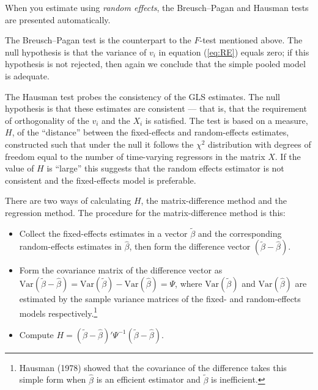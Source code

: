 When you estimate using \textsl{random effects}, the Breusch--Pagan
and Hausman tests are presented automatically.  

The Breusch--Pagan test is the counterpart to the $F$-test mentioned
above.  The null hypothesis is that the variance of $v_i$ in
equation (\ref{eq:RE}) equals zero; if this hypothesis is not rejected,
then again we conclude that the simple pooled model is adequate.

The Hausman test probes the consistency of the GLS estimates.  The
null hypothesis is that these estimates are consistent --- that is,
that the requirement of orthogonality of the $v_i$ and the $X_i$ is
satisfied.  The test is based on a measure, $H$, of the ``distance''
between the fixed-effects and random-effects estimates, constructed
such that under the null it follows the $\chi^2$ distribution with
degrees of freedom equal to the number of time-varying regressors in
the matrix $X$.  If the value of $H$ is ``large'' this suggests that
the random effects estimator is not consistent and the fixed-effects
model is preferable.

There are two ways of calculating $H$, the matrix-difference method
and the regression method.  The procedure for the matrix-difference
method is this:
\begin{itemize}
\item Collect the fixed-effects estimates in a vector
  $\tilde{\beta}$ and the corresponding random-effects estimates in
  $\hat{\beta}$, then form the difference vector $(\tilde{\beta} -
  \hat{\beta})$. 
\item Form the covariance matrix of the difference vector as
  $\mbox{Var}(\tilde{\beta} - \hat{\beta}) = \mbox{Var}(\tilde{\beta})
  - \mbox{Var}(\hat{\beta}) = \Psi$, where $\mbox{Var}(\tilde{\beta})$
  and $\mbox{Var}(\hat{\beta})$ are estimated by the sample variance
  matrices of the fixed- and random-effects models
  respectively.\footnote{Hausman (1978) showed that the covariance of
    the difference takes this simple form when $\hat{\beta}$ is an
    efficient estimator and $\tilde{\beta}$ is inefficient.}
\item Compute $H = \left(\tilde{\beta} - \hat{\beta}\right)' \Psi^{-1}
   \left(\tilde{\beta} - \hat{\beta}\right)$.
\end{itemize}

